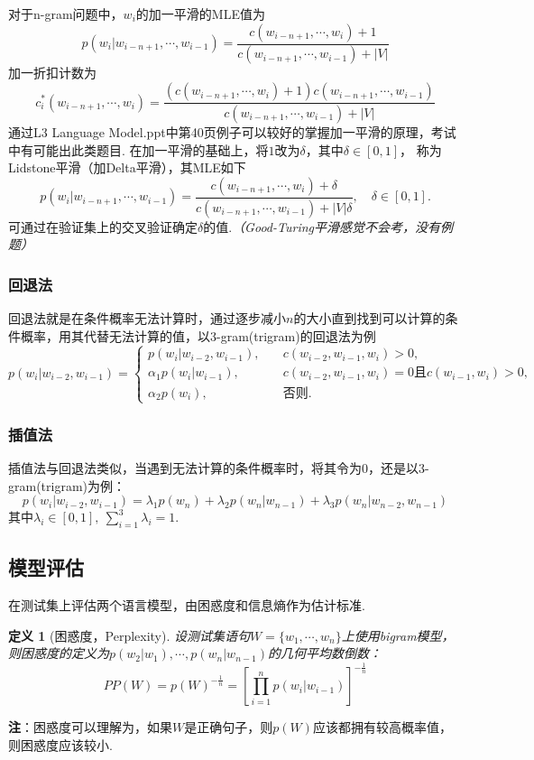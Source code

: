 \documentclass[12pt, a4paper, oneside]{ctexart}
\newtheorem{definition}{定义}
\numberwithin{equation}{section}  %
\begin{document}
对于n-gram问题中，$w_i$的加一平滑的MLE值为
\begin{equation*}
    p(w_i|w_{i-n+1},\cdots, w_{i-1}) = \frac{c(w_{i-n+1},\cdots, w_i)+1}{c(w_{i-n+1},\cdots,w_{i-1})+|V|}   
\end{equation*}
加一折扣计数为
\begin{equation*}
    c^*_i(w_{i-n+1},\cdots,w_i) = \frac{(c(w_{i-n+1},\cdots,w_i)+1)c(w_{i-n+1},\cdots,w_{i-1})}{c(w_{i-n+1},\cdots,w_{i-1})+|V|}
\end{equation*}
通过L3 Language Model.ppt中第40页例子可以较好的掌握加一平滑的原理，考试中有可能出此类题目. 在加一平滑的基础上，将$1$改为$\delta$，其中$\delta\in [0,1]$，
称为Lidstone平滑（加Delta平滑），其MLE如下
\begin{equation*}
    p(w_i|w_{i-n+1},\cdots, w_{i-1}) = \frac{c(w_{i-n+1},\cdots, w_i)+\delta}{c(w_{i-n+1},\cdots,w_{i-1})+|V|\delta},\quad \delta\in[0,1].
\end{equation*}
可通过在验证集上的交叉验证确定$\delta$的值.\textit{（Good-Turing平滑感觉不会考，没有例题）}

\subsubsection{回退法}
回退法就是在条件概率无法计算时，通过逐步减小$n$的大小直到找到可以计算的条件概率，用其代替无法计算的值，以3-gram(trigram)的回退法为例
\begin{equation*}
    p(w_{i}|w_{i-2},w_{i-1}) = \begin{cases}
        p(w_i|w_{i-2},w_{i-1}),&\quad c(w_{i-2},w_{i-1},w_{i}) > 0,\\
        \alpha_1 p(w_i|w_{i-1}),&\quad c(w_{i-2},w_{i-1},w_i) = 0\text{且}c(w_{i-1},w_i) > 0,\\
        \alpha_2 p(w_i),&\quad \text{否则}.
    \end{cases}
\end{equation*}
\subsubsection{插值法}
插值法与回退法类似，当遇到无法计算的条件概率时，将其令为$0$，还是以3-gram(trigram)为例：
\begin{equation*}
    p(w_i|w_{i-2},w_{i-1}) = \lambda_1p(w_n)+\lambda_2p(w_n|w_{n-1})+\lambda_3p(w_n|w_{n-2},w_{n-1})
\end{equation*}
其中$\lambda_i\in[0,1],\ \sum_{i=1}^3\lambda_i = 1$.
\subsection{模型评估}
在测试集上评估两个语言模型，由困惑度和信息熵作为估计标准.
\begin{definition}[困惑度，Perplexity]
    设测试集语句$W=\{w_1,\cdots,w_n\}$上使用bigram模型，则困惑度的定义为$p(w_2|w_1),\cdots,p(w_n|w_{n-1})$的几何平均数倒数：
    \begin{equation*}
        PP(W) = p(W)^{-\frac{1}{n}} = \left[\prod_{i=1}^np(w_i|w_{i-1})\right]^{-\frac{1}{n}}
    \end{equation*}
\end{definition}
\textbf{注}：困惑度可以理解为，如果$W$是正确句子，则$p(W)$应该都拥有较高概率值，则困惑度应该较小.
\end{document}
